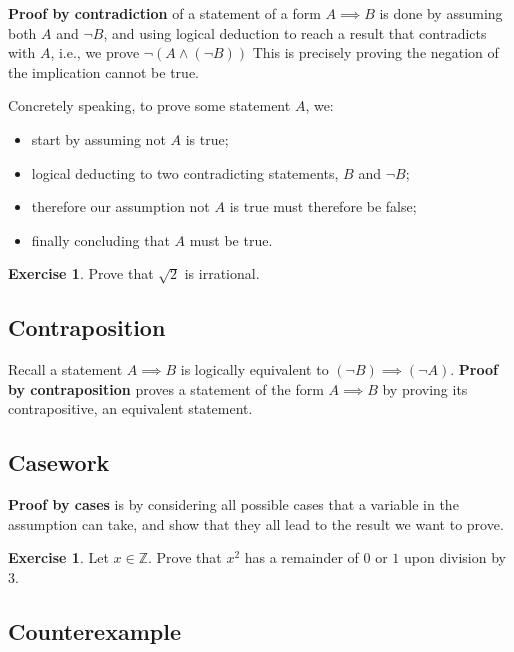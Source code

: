 \documentclass[11pt]{article}
\theoremstyle{definition}
\newtheorem{example}[theorem]{Exercise}
\theoremstyle{remark}
\newcommand{\pqty}[1]{\left(#1\right)}
\newcommand{\ZZ}{\mathbb{Z}}
\begin{document}
\textbf{Proof by contradiction} of a statement of a form \(A \implies B\) is done by assuming both \(A\) and \(\lnot B\), and using logical deduction to reach a result that contradicts with \(A\), i.e., we prove \(\lnot \pqty{A \land \pqty{\lnot B}}\) This is precisely proving the negation of the implication cannot be true.

Concretely speaking, to prove some statement \(A\), we:
\begin{itemize}
    \item start by assuming not \(A\) is true;
    \item logical deducting to two contradicting statements, \(B\) and \(\lnot B\);
    \item therefore our assumption not \(A\) is true must therefore be false;
    \item finally concluding that \(A\) must be true.
\end{itemize}

\begin{example}\label{tmua-6-unit-020}
    Prove that \(\sqrt{2}\) is irrational.
\end{example}

\subsection{Contraposition}\label{tmua-6-subsection-009}

Recall a statement \(A \implies B\) is logically equivalent to \(\pqty{\lnot B} \implies \pqty{\lnot A}\). \textbf{Proof by contraposition} proves a statement of the form \(A \implies B\) by proving its contrapositive, an equivalent statement.

\subsection{Casework}\label{tmua-6-subsection-010}

\textbf{Proof by cases} is by considering all possible cases that a variable in the assumption can take, and show that they all lead to the result we want to prove.

\begin{example}\label{tmua-6-unit-021}
    Let \(x \in \ZZ\). Prove that \(x^2\) has a remainder of \(0\) or \(1\) upon division by \(3\).
\end{example}

\subsection{Counterexample}\label{tmua-6-subsection-011}
\end{document}
